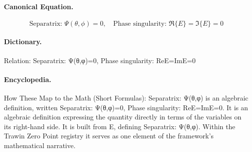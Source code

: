 \paragraph{Canonical Equation.}
\[
\text{Separatrix: } \Psi(\theta,\phi)=0,\quad\text{Phase singularity: } \Re\{E\}=\Im\{E\}=0
\]

\paragraph{Dictionary.}
Relation: Separatrix: Ψ(θ,φ)=0, Phase singularity: ReE=ImE=0

\paragraph{Encyclopedia.}
How These Map to the Math (Short Formulas): Separatrix: Ψ(θ,φ) is an algebraic definition, written Separatrix: Ψ(θ,φ)=0, Phase singularity: ReE=ImE=0. It is an algebraic definition expressing the quantity directly in terms of the variables on its right-hand side. It is built from E, defining Separatrix: Ψ(θ,φ). Within the Trawin Zero Point registry it serves as one element of the framework's mathematical narrative.
